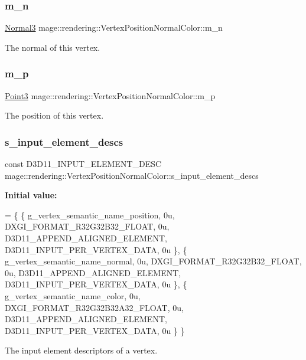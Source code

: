 \subsubsection{\texorpdfstring{m\+\_\+n}{m\_n}}
{\footnotesize\ttfamily \mbox{\hyperlink{structmage_1_1_normal3}{Normal3}} mage\+::rendering\+::\+Vertex\+Position\+Normal\+Color\+::m\+\_\+n}

The normal of this vertex. \mbox{\label{structmage_1_1rendering_1_1_vertex_position_normal_color_ad89961e1a0b0bd97f580a34709e4e05f}} 
\subsubsection{\texorpdfstring{m\+\_\+p}{m\_p}}
{\footnotesize\ttfamily \mbox{\hyperlink{structmage_1_1_point3}{Point3}} mage\+::rendering\+::\+Vertex\+Position\+Normal\+Color\+::m\+\_\+p}

The position of this vertex. \mbox{\label{structmage_1_1rendering_1_1_vertex_position_normal_color_adadf05a78d26b87baef8a9c3cb80ae54}} 
\subsubsection{\texorpdfstring{s\+\_\+input\+\_\+element\+\_\+descs}{s\_input\_element\_descs}}
{\footnotesize\ttfamily const D3\+D11\+\_\+\+I\+N\+P\+U\+T\+\_\+\+E\+L\+E\+M\+E\+N\+T\+\_\+\+D\+E\+SC mage\+::rendering\+::\+Vertex\+Position\+Normal\+Color\+::s\+\_\+input\+\_\+element\+\_\+descs\hspace{0.3cm}{\ttfamily [static]}}

{\bfseries Initial value\+:}
\begin{DoxyCode}
= \{
        \{ g\_vertex\_semantic\_name\_position, 0u, DXGI\_FORMAT\_R32G32B32\_FLOAT,    0u, 
      D3D11\_APPEND\_ALIGNED\_ELEMENT, D3D11\_INPUT\_PER\_VERTEX\_DATA, 0u \},
        \{ g\_vertex\_semantic\_name\_normal,   0u, DXGI\_FORMAT\_R32G32B32\_FLOAT,    0u, 
      D3D11\_APPEND\_ALIGNED\_ELEMENT, D3D11\_INPUT\_PER\_VERTEX\_DATA, 0u \},
        \{ g\_vertex\_semantic\_name\_color,    0u, DXGI\_FORMAT\_R32G32B32A32\_FLOAT, 0u, 
      D3D11\_APPEND\_ALIGNED\_ELEMENT, D3D11\_INPUT\_PER\_VERTEX\_DATA, 0u \}
    \}
\end{DoxyCode}
The input element descriptors of a vertex. 